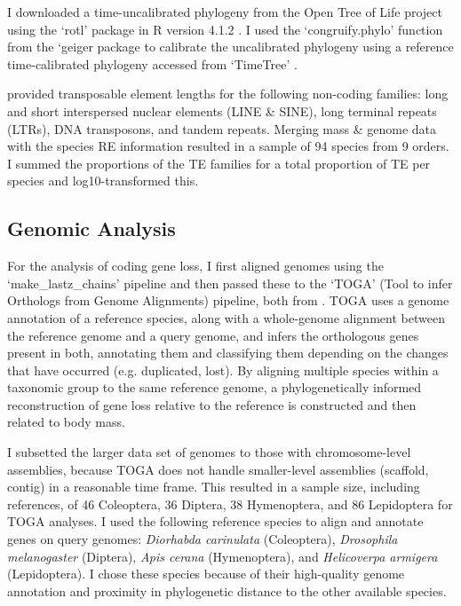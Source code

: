 \documentclass[11pt]{article}
\begin{document}
I downloaded a time-uncalibrated phylogeny from the Open Tree of Life project using the `rotl' package \citep{Michonneau2016-tx} in R version 4.1.2 \citep{R-citation}. I used the `congruify.phylo' function from the `geiger package \citep{congruify, geiger} to calibrate the uncalibrated phylogeny using a reference time-calibrated phylogeny accessed from `TimeTree' \citep{timetree}.

\cite{600TEs} provided transposable element lengths for the following non-coding families: long and short interspersed nuclear elements (LINE \& SINE), long terminal repeats (LTRs), DNA transposons, and tandem repeats. Merging mass \& genome data with the species RE information resulted in a sample of 94 species from 9 orders. I summed the proportions of the TE families for a total proportion of TE per species and log10-transformed this. 


\subsection{Genomic Analysis}
For the analysis of coding gene loss, I first aligned genomes using the `make\_lastz\_chains' pipeline and then passed these to the `TOGA' (Tool to infer Orthologs from Genome Alignments) pipeline, both from \cite{TOGA}. TOGA uses a genome annotation of a reference species, along with a whole-genome alignment between the reference genome and a query genome, and infers the orthologous genes present in both, annotating them and classifying them depending on the changes that have occurred (e.g. duplicated, lost). By aligning multiple species within a taxonomic group to the same reference genome, a phylogenetically informed reconstruction of gene loss relative to the reference is constructed and then related to body mass. 

I subsetted the larger data set of genomes to those with chromosome-level assemblies, because TOGA does not handle smaller-level assemblies (scaffold, contig) in a reasonable time frame. This resulted in a sample size, including references, of 46 Coleoptera,  36 Diptera, 38 Hymenoptera, and 86 Lepidoptera for TOGA analyses. I used the following reference species to align and annotate genes on query genomes: \textit{Diorhabda carinulata} (Coleoptera), \textit{Drosophila melanogaster} (Diptera), \textit{Apis cerana} (Hymenoptera), and \textit{Helicoverpa armigera} (Lepidoptera). I chose these species because of their high-quality genome annotation and proximity in phylogenetic distance to the other available species. 
\end{document}
